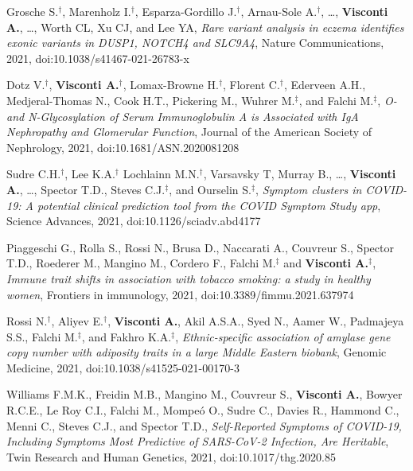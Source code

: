 \documentclass[a4paper,10pt]{article}
\begin{document}
{\begin{itemize}
	    Grosche S.$^{\textbf{$\dag $}}$, Marenholz I.$^{\textbf{$\dag $}}$, Esparza-Gordillo J.$^{\textbf{$\dag $}}$, Arnau-Sole A.$^{\textbf{$\dag $}}$, \dots, \textbf{Visconti A.}, \dots, Worth CL, Xu CJ, and Lee YA, \emph{Rare variant analysis in eczema identifies exonic variants in DUSP1, NOTCH4 and SLC9A4}, Nature Communications, 2021, doi:10.1038/s41467-021-26783-x

	    Dotz V.$^{\textbf{$\dag $}}$, \textbf{Visconti A.}$^{\textbf{$\dag $}}$, Lomax-Browne H.$^{\textbf{$\dag $}}$, Florent C.$^{\textbf{$\dag $}}$, Ederveen A.H., Medjeral-Thomas N., Cook H.T., Pickering M.,  Wuhrer M.$^{\textbf{$\ddag $}}$, and Falchi M.$^{\textbf{$\ddag $}}$, \emph{O- and N-Glycosylation of Serum Immunoglobulin A is Associated with IgA Nephropathy and Glomerular Function}, Journal of the American Society of Nephrology, 2021, doi:10.1681/ASN.2020081208

		 Sudre C.H.$^{\textbf{$\dag $}}$, Lee K.A.$^{\textbf{$\dag $}}$ Lochlainn M.N.$^{\textbf{$\dag $}}$, Varsavsky T, Murray B., \dots, \textbf{Visconti A.}, \dots, Spector T.D., Steves C.J.$^{\textbf{$\ddag $}}$, and Ourselin S.$^{\textbf{$\ddag $}}$, \emph{Symptom clusters in COVID-19: A potential clinical prediction tool from the COVID Symptom Study app}, Science Advances, 2021, doi:10.1126/sciadv.abd4177
				
		  Piaggeschi G., Rolla S., Rossi N., Brusa D., Naccarati A., Couvreur S., Spector T.D., Roederer M., Mangino M., Cordero F., Falchi M.$^{\textbf{$\ddag $}}$ and \textbf{Visconti A.}$^{\textbf{$\ddag $}}$, \emph{Immune trait shifts in association with tobacco smoking: a study in healthy women}, Frontiers in immunology, 2021, doi:10.3389/fimmu.2021.637974
		
	    Rossi N.$^{\textbf{$\dag $}}$, Aliyev E.$^{\textbf{$\dag $}}$, \textbf{Visconti A.}, Akil A.S.A., Syed N., Aamer W., Padmajeya S.S., Falchi M.$^{\textbf{$\ddag $}}$, and Fakhro K.A.$^{\textbf{$\ddag $}}$, \emph{Ethnic-specific association of amylase gene copy number with adiposity traits in a large Middle Eastern biobank}, Genomic Medicine, 2021, doi:10.1038/s41525-021-00170-3
		
 	   	Williams F.M.K., Freidin M.B., Mangino M., Couvreur S., \textbf{Visconti A.}, Bowyer R.C.E., Le Roy C.I., Falchi M., Mompe\'o O., Sudre C., Davies R., Hammond C., Menni C., Steves C.J., and Spector T.D., \emph{Self-Reported Symptoms of COVID-19, Including Symptoms Most Predictive of SARS-CoV-2 Infection, Are Heritable}, Twin Research and Human Genetics, 2021, doi:10.1017/thg.2020.85
		

\end{itemize}}
\end{document}
